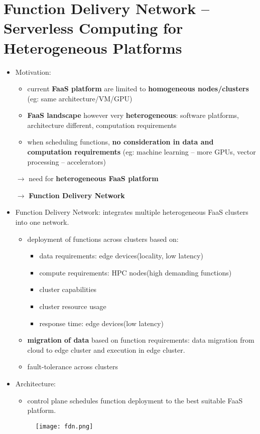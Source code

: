 \section{Function Delivery Network -- Serverless Computing for Heterogeneous Platforms }

\begin{itemize}
	\item Motivation:
	\begin{itemize}
		\item current \textbf{FaaS platform} are limited to \textbf{homogeneous nodes/clusters} (eg: same architecture/VM/GPU)
		\item \textbf{FaaS landscape} however very \textbf{heterogeneous}: software platforms, architecture different, computation requirements
		\item when scheduling functions, \textbf{no consideration in data and computation requirements} (eg: machine learning -- more GPUs, vector processing -- accelerators)
		
	\end{itemize}

	$\rightarrow$ need for \textbf{heterogeneous FaaS platform} 
	
	$\rightarrow$ \textbf{Function Delivery Network}
	
	\item Function Delivery Network: integrates multiple heterogeneous FaaS clusters into one network.
	\begin{itemize}
		\item deployment of functions across clusters based on:
		\begin{itemize}
			\item data requirements: edge devices(locality, low latency)
			\item compute requirements: HPC nodes(high demanding functions)
			\item cluster capabilities
			\item cluster resource usage
			\item response time: edge devices(low latency)
		\end{itemize}
		\item \textbf{migration of data} based on function requirements: data migration from cloud to edge cluster and execution in edge cluster.
		\item fault-tolerance across clusters 
	\end{itemize}
	\item Architecture:
	\begin{itemize}
		\item control plane schedules function deployment to the best suitable FaaS platform.
	\end{itemize}
	\begin{figure}[H]
		\centering
		\texttt{[image: fdn.png]}
	\end{figure}
\end{itemize}
